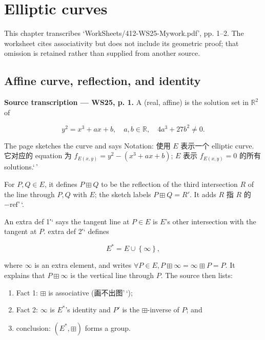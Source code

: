 \chapter{Elliptic curves}\label{elliptic-curves}

This chapter transcribes `WorkSheets/412-WS25-Mywork.pdf', pp. 1--2. The worksheet cites associativity but does not include its geometric proof; that omission is retained rather than supplied from another source.

\section{Affine curve, reflection, and identity}

\textbf{Source transcription --- WS25, p. 1.} A (real, affine)  is the solution set in \(\mathbb{R}^{2}\) of

\[y^{2} = x^{3} + ax + b,\quad a,b \in \mathbb{R},\quad 4a^{3} + 27b^{2} \neq 0.\]

The page sketches the curve and says Notation: 使用 \(E\) 表示一个 elliptic curve. 它对应的 equation 为 \(f_{E{({x,y})}} = y^{2} - \left( {x^{3} + ax + b} \right)\); \(E\) 表示 \(f_{E{({x,y})}} = 0\) 的所有 solutions.`\,'

For \(P,Q \in E\), it defines \(P \boxplus Q\) to be the reflection of the third intersection \(R\) of the line through \(P,Q\) with \(E\); the sketch labels \(P \boxplus Q = R'\). It adds \(R\) 指 \(R\) 的 \(- \text{ref}\)'\,`.

An extra def 1′` says the tangent line at \(P \in E\) is \(E\)'s other intersection with the tangent at \(P\). extra def 2′` defines

\[E^{\ast} = E \cup \left\{ \infty \right\},\]

where \(\infty\) is an extra element, and writes \(\forall P \in E,P \boxplus \infty = \infty \boxplus P = P\). It explains that \(P \boxplus \infty\) is the vertical line through \(P\). The source then lists:

\begin{enumerate}
\tightlist
\item
  Fact 1: \(\boxplus\) is associative (画不出图'\,`);
\item
  Fact 2: \(\infty\) is \(E^{\ast}\)'s identity and \(P'\) is the \(\boxplus\)-inverse of \(P\); and
\item
  conclusion: \(\left( {E^{\ast}, \boxplus} \right)\) forms a group.
\end{enumerate}

